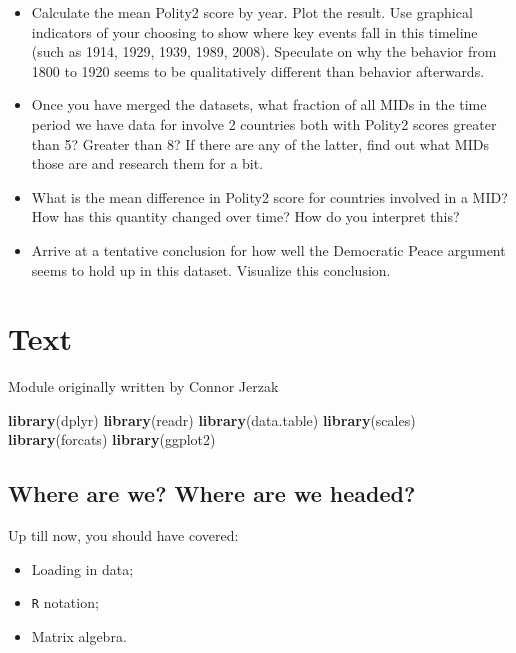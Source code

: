 \documentclass[]{book}
\newenvironment{Shaded}{\begin{snugshade}}{\end{snugshade}}
\newcommand{\KeywordTok}[1]{\textcolor[rgb]{0.13,0.29,0.53}{\textbf{#1}}}
\newcommand{\NormalTok}[1]{#1}
\providecommand{\tightlist}{%
  \setlength{\itemsep}{0pt}\setlength{\parskip}{0pt}}
\theoremstyle{definition}
\theoremstyle{definition}
\theoremstyle{definition}
\theoremstyle{remark}
\begin{document}
\begin{itemize}
\tightlist
\item
  Calculate the mean Polity2 score by year. Plot the result. Use
  graphical indicators of your choosing to show where key events fall in
  this timeline (such as 1914, 1929, 1939, 1989, 2008). Speculate on why
  the behavior from 1800 to 1920 seems to be qualitatively different
  than behavior afterwards.
\item
  Once you have merged the datasets, what fraction of all MIDs in the
  time period we have data for involve 2 countries both with Polity2
  scores greater than 5? Greater than 8? If there are any of the latter,
  find out what MIDs those are and research them for a bit.
\item
  What is the mean difference in Polity2 score for countries involved in
  a MID? How has this quantity changed over time? How do you interpret
  this?
\item
  Arrive at a tentative conclusion for how well the Democratic Peace
  argument seems to hold up in this dataset. Visualize this conclusion.
\end{itemize}

\chapter{Text}\label{text}

Module originally written by Connor Jerzak

\begin{Shaded}
\begin{Highlighting}[]
\KeywordTok{library}\NormalTok{(dplyr)}
\KeywordTok{library}\NormalTok{(readr)}
\KeywordTok{library}\NormalTok{(data.table)}
\KeywordTok{library}\NormalTok{(scales)}
\KeywordTok{library}\NormalTok{(forcats)}
\KeywordTok{library}\NormalTok{(ggplot2)}
\end{Highlighting}
\end{Shaded}

\section{Where are we? Where are we
headed?}\label{where-are-we-where-are-we-headed-3}

Up till now, you should have covered:

\begin{itemize}
\tightlist
\item
  Loading in data;
\item
  \texttt{R} notation;
\item
  Matrix algebra.
\end{itemize}
\end{document}
